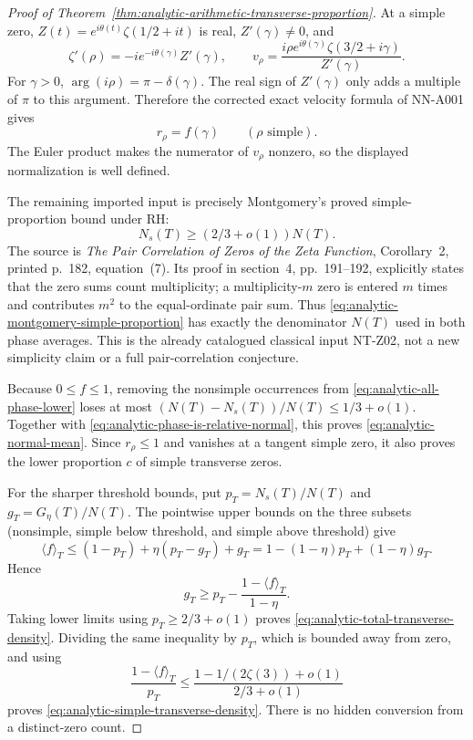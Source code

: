 \begin{proof}[Proof of Theorem~\ref{thm:analytic-arithmetic-transverse-proportion}]
At a simple zero, $Z(t)=e^{i\theta(t)}\zeta(1/2+it)$ is
real, $Z'(\gamma)\ne0$, and
\[
 \zeta'(\rho)=-i e^{-i\theta(\gamma)}Z'(\gamma),\qquad
 v_\rho=\frac{i\rho e^{i\theta(\gamma)}
                   \zeta(3/2+i\gamma)}{Z'(\gamma)}.
\]
For $\gamma>0$, $\arg(i\rho)=\pi-\delta(\gamma)$.
The real sign of $Z'(\gamma)$ only adds a multiple of $\pi$
to this argument. Therefore the corrected exact velocity
formula of NN-A001 gives
\begin{equation}\label{eq:analytic-phase-is-relative-normal}
                   r_\rho=f(\gamma)
                       \qquad(\rho\text{ simple}).
\end{equation}
The Euler product makes the numerator of $v_\rho$ nonzero,
so the displayed normalization is well defined.

The remaining imported input is precisely Montgomery's
proved simple-proportion bound under RH:
\begin{equation}\label{eq:analytic-montgomery-simple-proportion}
                   N_s(T)\ge(2/3+o(1))N(T).
\end{equation}
The source is \emph{The Pair Correlation of Zeros of the
Zeta Function}, Corollary~2, printed p.~182, equation~(7).
Its proof in section~4, pp.~191--192, explicitly states
that the zero sums count multiplicity; a multiplicity-$m$
zero is entered $m$ times and contributes $m^2$ to the
equal-ordinate pair sum. Thus
\eqref{eq:analytic-montgomery-simple-proportion} has exactly
the denominator $N(T)$ used in both phase averages. This is
the already catalogued classical input NT-Z02, not a new
simplicity claim or a full pair-correlation conjecture.

Because $0\le f\le1$, removing the nonsimple occurrences
from \eqref{eq:analytic-all-phase-lower} loses at most
$(N(T)-N_s(T))/N(T)\le1/3+o(1)$. Together with
\eqref{eq:analytic-phase-is-relative-normal}, this proves
\eqref{eq:analytic-normal-mean}. Since $r_\rho\le1$ and
vanishes at a tangent simple zero, it also proves the lower
proportion $c$ of simple transverse zeros.

For the sharper threshold bounds, put
$p_T=N_s(T)/N(T)$ and $g_T=G_\eta(T)/N(T)$. The pointwise
upper bounds on the three subsets (nonsimple, simple below
threshold, and simple above threshold) give
\[
 \langle f\rangle_T
       \le (1-p_T)+\eta(p_T-g_T)+g_T
       =1-(1-\eta)p_T+(1-\eta)g_T.
\]
Hence
\[
 g_T\ge p_T-\frac{1-\langle f\rangle_T}{1-\eta}.
\]
Taking lower limits using $p_T\ge2/3+o(1)$ proves
\eqref{eq:analytic-total-transverse-density}. Dividing the
same inequality by $p_T$, which is bounded away from zero,
and using
\[
 \frac{1-\langle f\rangle_T}{p_T}
       \le\frac{1-1/(2\zeta(3))+o(1)}{2/3+o(1)}
\]
proves \eqref{eq:analytic-simple-transverse-density}.
There is no hidden conversion from a distinct-zero count.


\end{proof}
